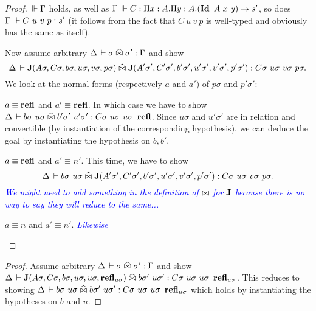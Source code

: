 \documentclass[a4paper,english]{lipics-utf8x}
\newcommand\meta[1]{\noindent\textcolor{blue}{\emph{#1}}}
\begin{document}
  \begin{proof}
    $\,\Vdash \Gamma$ holds, as well as
    $\Gamma \,\Vdash C : \Pi x:A. \Pi y:A. (\operatorname{\mathbf{Id}~} A\ x\ y) \to s'$,
    so does $\Gamma \,\Vdash C\ u\ v\ p : s'$ (it follows from the fact that
    $C\ u\ v\ p$ is well-typed and obviously has the same as itself).

    Now assume arbitrary $\Delta \,\vdash \sigma \mathrel{\widehat{\bowtie}} \sigma' : \Gamma$ and show
    \[\Delta \,\vdash \operatorname{\mathbf{J}}(A \sigma, C \sigma, b \sigma, u \sigma, v \sigma, p \sigma)
    \mathrel{\widehat{\bowtie}} \operatorname{\mathbf{J}}(A' \sigma', C' \sigma', b' \sigma', u' \sigma', v' \sigma', p'
    \sigma') : C \sigma\ u \sigma\ v \sigma\ p \sigma.\]
    We look at the normal forms (respectively $a$ and $a'$) of $p \sigma$ and
    $p' \sigma'$:
    \begin{caselist}
      \nextcase $a \equiv \operatorname{\mathbf{refl}}$ and $a' \equiv \operatorname{\mathbf{refl}}$.
      In which case we have to show
      $\Delta \,\vdash b \sigma\ u\sigma \mathrel{\widehat{\bowtie}} b'\sigma'\ u'\sigma' :
      C \sigma\ u \sigma\ u \sigma\ \operatorname{\mathbf{refl}}$.
      Since $u\sigma$ and $u'\sigma'$ are in relation and convertible
      (by instantiation of the corresponding hypothesis), we can deduce the
      goal by instantiating the hypothesis on $b,b'$.

      \nextcase $a \equiv \operatorname{\mathbf{refl}}$ and $a' \equiv n'$.
      This time, we have to show
      \[\Delta \,\vdash b \sigma\ u\sigma
      \mathrel{\widehat{\bowtie}} \operatorname{\mathbf{J}}(A' \sigma', C' \sigma', b' \sigma', u' \sigma', v' \sigma', p'
      \sigma') : C \sigma\ u \sigma\ v \sigma\ p \sigma.\]
      \meta{We might need to add something in the definition of $\mathrel{\bowtie}$ for $\operatorname{\mathbf{J}}$
      because there is no way to say they will reduce to the same...}

      \nextcase $a \equiv n$ and $a' \equiv n'$.
      \meta{Likewise}
    \end{caselist}
  \end{proof}

  \begin{lemma}
    \leavevmode
    \begin{mathc}
    \end{mathc}
  \end{lemma}

  \begin{proof}
    Assume arbitrary $\Delta \,\vdash \sigma \mathrel{\widehat{\bowtie}} \sigma' : \Gamma$ and show
    $\Delta \der \J (A\sigma,C\sigma,b\sigma,u\sigma,u\sigma,\refl_{u\sigma})
    \hEr b\sigma'\ u\sigma' : C\sigma\ u\sigma\ u\sigma\ \refl_{u\sigma}$.
    This reduces to showing
    $\Delta \der b\sigma\ u\sigma
    \hEr b\sigma'\ u\sigma' : C\sigma\ u\sigma\ u\sigma\ \refl_{u\sigma}$
    which holds by instantiating the hypotheses on $b$ and $u$.
  \end{proof}
\end{document}
